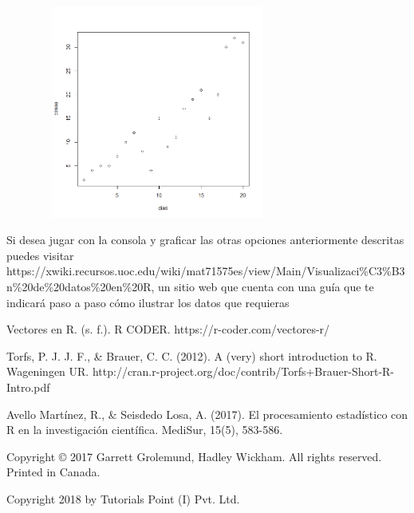\documentclass{article}
\begin{document}
{\begin{center}
    \includegraphics[width=10cm, height=7cm]{grafica.png}\\
\end{center}
Si desea jugar con la consola y graficar las otras opciones anteriormente descritas puedes visitar \\ https://xwiki.recursos.uoc.edu/wiki/mat71575es/view/Main/Visualizaci\%C3\%B3n\%20de\%20datos\%20en\%20R, un sitio web que cuenta con una guía que te indicará paso a paso cómo ilustrar los datos que requieras
}

\newpage

\begin{thebibliography}{20}

Vectores en R. (s. f.). R CODER. https://r-coder.com/vectores-r/

Torfs, P. J. J. F., & Brauer, C. C. (2012). A (very) short introduction to R. Wageningen UR. http://cran.r-project.org/doc/contrib/Torfs+Brauer-Short-R-Intro.pdf

Avello Martínez, R., & Seisdedo Losa, A. (2017). El procesamiento estadístico con R en la investigación científica. MediSur, 15(5), 583-586.

Copyright © 2017 Garrett Grolemund, Hadley Wickham. All rights reserved. Printed in Canada.

Copyright 2018 by Tutorials Point (I) Pvt. Ltd.

\end{thebibliography}
\end{document}
